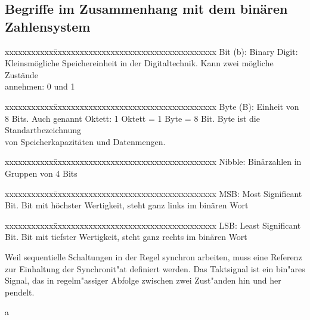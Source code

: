 \subsection{Begriffe im Zusammenhang mit dem binären Zahlensystem}
	\begin{compactitem}	
		\item 
			\begin{tabbing}
				xxxxxxxxxxx\=xxxxxxxxxxxxxxxxxxxxxxxxxxxxxxxxxxxxx\kill	
				Bit (b): \>
							Binary Digit: Kleinsmögliche Speichereinheit in der Digitaltechnik. Kann zwei mögliche Zustände\\
				 		\>	annehmen: 0 und 1
			\end{tabbing}
		\item 
			\begin{tabbing}
				xxxxxxxxxxx\=xxxxxxxxxxxxxxxxxxxxxxxxxxxxxxxxxxxxx\kill	
				Byte (B): \>
							Einheit von 8 Bits. Auch genannt Oktett: 1 Oktett = 1 Byte = 8 Bit. Byte ist die Standartbezeichnung\\
						\>	von Speicherkapazitäten und Datenmengen.
			\end{tabbing}
		\item 
			\begin{tabbing}
				xxxxxxxxxxx\=xxxxxxxxxxxxxxxxxxxxxxxxxxxxxxxxxxxxx\kill	
				Nibble: \>
							Binärzahlen in Gruppen von 4 Bits
			\end{tabbing}
		\item 
			\begin{tabbing}
				xxxxxxxxxxx\=xxxxxxxxxxxxxxxxxxxxxxxxxxxxxxxxxxxxx\kill	
				MSB: \>
							Most Significant Bit. Bit mit höchster Wertigkeit, steht ganz links im binären Wort
			\end{tabbing}
		\item 
			\begin{tabbing}
				xxxxxxxxxxx\=xxxxxxxxxxxxxxxxxxxxxxxxxxxxxxxxxxxxx\kill	
				LSB: \>
							Least Significant Bit. Bit mit tiefster Wertigkeit, steht ganz rechts im binären Wort
			\end{tabbing}
	\end{compactitem}

	\begin{minipage}{8 cm}
	Weil sequentielle Schaltungen in der Regel synchron arbeiten, muss eine Referenz zur Einhaltung der Synchronit"at definiert werden. Das Taktsignal ist ein bin"ares Signal, das in regelm"assiger Abfolge zwischen zwei Zust"anden hin und her pendelt.
	\end{minipage}a


